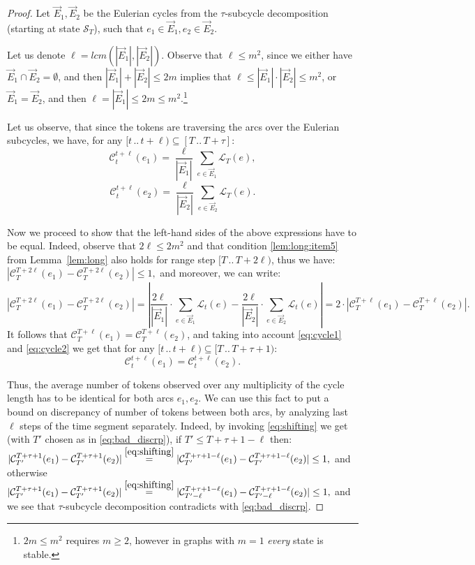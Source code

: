 \documentclass{article}[11pt,letter]
\newcommand{\state}{\mathcal{S}}
\newcommand{\load}{\mathcal{L}}
\newcommand{\cload}{\mathcal{C}}
\newcommand{\closedrange}[2]{[#1\,..\,#2]}
\newcommand{\halfrange}[2]{[#1\,..\,#2)}
\begin{document}
\begin{proof}
Let $\vec{E}_1,\vec{E}_2$ be the Eulerian cycles from the $\tau$-subcycle decomposition (starting at state $\state_T$), such that $e_1 \in \vec{E}_1, e_2 \in \vec{E}_2$.



Let us denote $\ell = lcm(|\vec{E}_1|,|\vec{E}_2|)$.
Observe that $\ell \le m^2$, since we either have $\vec{E}_1 \cap \vec{E}_2 = \emptyset$, and then $|\vec{E}_1|+|\vec{E}_2| \le 2m$ implies that $\ell \le |\vec{E}_1|\cdot|\vec{E}_2| \le m^2$, or $\vec{E}_1 = \vec{E}_2$, and then $\ell = |\vec{E}_1| \le 2m \le m^2$.\footnote{$2m \le m^2$ requires $m\ge 2$, however in graphs with $m=1$ \emph{every} state is stable.}

Let us observe, that since the tokens are traversing the arcs over the Eulerian subcycles, we have, for any $\halfrange{t}{t+\ell} \subseteq \closedrange{T}{T+\tau}$:
\begin{equation}
\label{eq:cycle1}
\cload_{t}^{t+\ell}(e_1) = \frac{\ell}{|\vec{E}_1|} \sum_{e \in \vec{E}_1} \load_T(e),
\end{equation}
\begin{equation}
\label{eq:cycle2}
\cload_{t}^{t+\ell}(e_2) = \frac{\ell}{|\vec{E}_2|} \sum_{e \in \vec{E}_2} \load_T(e).
\end{equation}


Now we proceed to show that the left-hand sides of the above expressions have to be equal.
Indeed, observe that $2\ell\leq 2m^2$ and that condition \eqref{lem:long:item5} from Lemma~\ref{lem:long} also holds for range step $\halfrange{T}{T+2\ell}$, thus we have:
$|\cload_T^{T+2\ell}(e_1) - \cload_T^{T+2\ell}(e_2)| \leq 1,$
and moreover, we can write:
$$|\cload_T^{T+2\ell}(e_1) - \cload_T^{T+2\ell}(e_2)| = \left|\frac{2\ell}{|\vec{E}_1|}\cdot\sum_{e \in \vec{E}_1} \load_t(e) - \frac{2\ell}{|\vec{E}_2|}\cdot\sum_{e \in \vec{E}_2} \load_t(e)\right| = 2 \cdot |\cload_T^{T+\ell}(e_1) - \cload_T^{T+\ell}(e_2)|.$$
It follows that $\cload_T^{T+\ell}(e_1) = \cload_T^{T+\ell}(e_2)$, and taking into account \eqref{eq:cycle1} and \eqref{eq:cycle2} we get that for any $\halfrange{t}{t+\ell} \subseteq \halfrange{T}{T+\tau+1}$:
\begin{equation}\label{eq:shifting}\cload_{t}^{t+\ell}(e_1) = \cload_{t}^{t+\ell}(e_2).\end{equation}

Thus, the average number of tokens observed over any multiplicity of the cycle length has to be identical for both arcs $e_1,e_2$. We can use this fact to put a bound on discrepancy of number of tokens between both arcs, by analyzing last $\ell$ steps of the time segment separately.
Indeed, by invoking \eqref{eq:shifting} we get (with $T'$ chosen as in \eqref{eq:bad_discrp}),
if $T' \le T+\tau+1-\ell$ then:
$ |\cload_{T'}^{T+\tau+1}(e_1) - \cload_{T'}^{T+\tau+1}(e_2)|
 \stackrel{\eqref{eq:shifting}}{=} |\cload_{T'}^{T+\tau+1-\ell}(e_1)   - \cload_{T'}^{T+\tau+1-\ell}(e_2) |\le 1,$
and otherwise
$ |\cload_{T'}^{T+\tau+1}(e_1) - \cload_{T'}^{T+\tau+1}(e_2)|
 \stackrel{\eqref{eq:shifting}}{=} |\cload_{T'-\ell}^{T+\tau+1-\ell}(e_1)   - \cload_{T'-\ell}^{T+\tau+1-\ell}(e_2) |\le 1,$
and we see that $\tau$-subcycle decomposition contradicts with \eqref{eq:bad_discrp}.


\end{proof}
\end{document}
